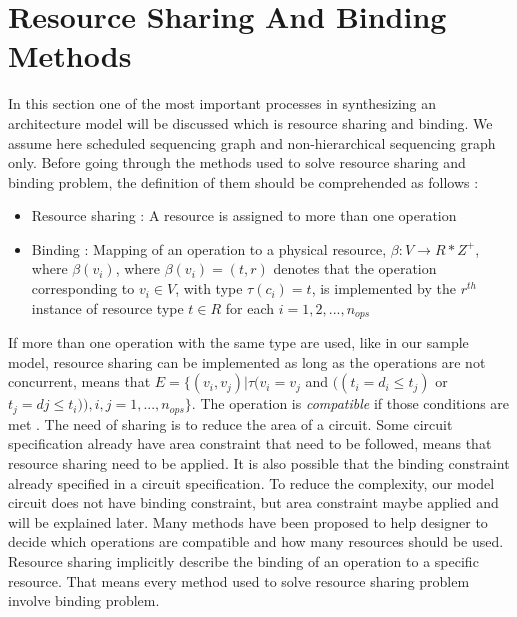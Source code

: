 \section{Resource Sharing And Binding Methods}





In this section one of the most important processes in synthesizing an architecture model will be discussed which is resource sharing and binding. We assume here scheduled sequencing graph and non-hierarchical sequencing graph only. Before going through the methods used to solve resource sharing and binding problem, the definition of them should be comprehended as follows \cite{main}:

\begin{itemize}
    \item Resource sharing : A resource is assigned to more than one operation
    \item Binding : Mapping of an operation to a physical resource, $\beta : V \xrightarrow{} R * Z^{+}$, where $\beta(v_{i})$, where $\beta(v_{i})=(t,r)$ denotes that the operation corresponding to $v_{i} \in V$, with type $\tau(c_{i}) = t$, is implemented by the $r^{th}$ instance of resource type $t \in R$ for each $i = 1,2,...,n_{ops}$
\end{itemize}

If more than one operation with the same type are used, like in our sample model, resource sharing can be implemented as long as the operations are not concurrent, means that $ E=\{(v_{i},v_{j})|\tau(v_{i}=v_{j} $ and $ ((t_{i}=d_{i} \leq t_{j}) $ or $ t_{j}=d{j} \leq t_{i})),i,j=1,...,n_{ops}\}$. The operation is \textit{compatible} if those conditions are met \cite{main}. The need of sharing is to reduce the area of a circuit. Some circuit specification already have area constraint that need to be followed, means that resource sharing need to be applied. It is also possible that the binding constraint already specified in a circuit specification. To reduce the complexity, our model circuit does not have binding constraint, but area constraint maybe applied and will be explained later. Many methods have been proposed to help designer to decide which operations are compatible and how many resources should be used. Resource sharing implicitly describe the binding of an operation to a specific resource. That means every method used to solve resource sharing problem involve binding problem. 

